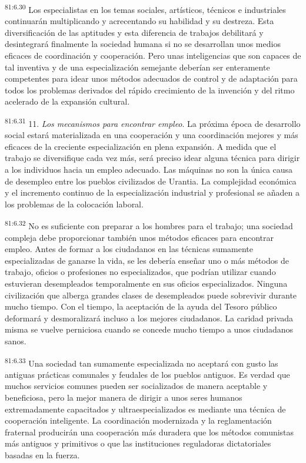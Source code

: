 \par
\textsuperscript{81:6.30} Los especialistas en los temas sociales, artísticos, técnicos e industriales continuarán multiplicando y acrecentando su habilidad y su destreza. Esta diversificación de las aptitudes y esta diferencia de trabajos debilitará y desintegrará finalmente la sociedad humana si no se desarrollan unos medios eficaces de coordinación y cooperación. Pero unas inteligencias que son capaces de tal inventiva y de una especialización semejante deberían ser enteramente competentes para idear unos métodos adecuados de control y de adaptación para todos los problemas derivados del rápido crecimiento de la invención y del ritmo acelerado de la expansión cultural.

\par
\textsuperscript{81:6.31} 11. \textit{Los mecanismos para encontrar empleo}. La próxima época de desarrollo social estará materializada en una cooperación y una coordinación mejores y más eficaces de la creciente especialización en plena expansión. A medida que el trabajo se diversifique cada vez más, será preciso idear alguna técnica para dirigir a los individuos hacia un empleo adecuado. Las máquinas no son la única causa de desempleo entre los pueblos civilizados de Urantia. La complejidad económica y el incremento continuo de la especialización industrial y profesional se añaden a los problemas de la colocación laboral.

\par
\textsuperscript{81:6.32} No es suficiente con preparar a los hombres para el trabajo; una sociedad compleja debe proporcionar también unos métodos eficaces para encontrar empleo. Antes de formar a los ciudadanos en las técnicas sumamente especializadas de ganarse la vida, se les debería enseñar uno o más métodos de trabajo, oficios o profesiones no especializados, que podrían utilizar cuando estuvieran desempleados temporalmente en sus oficios especializados. Ninguna civilización que alberga grandes clases de desempleados puede sobrevivir durante mucho tiempo. Con el tiempo, la aceptación de la ayuda del Tesoro público deformará y desmoralizará incluso a los mejores ciudadanos. La caridad privada misma se vuelve perniciosa cuando se concede mucho tiempo a unos ciudadanos sanos.

\par
\textsuperscript{81:6.33} Una sociedad tan sumamente especializada no aceptará con gusto las antiguas prácticas comunales y feudales de los pueblos antiguos. Es verdad que muchos servicios comunes pueden ser socializados de manera aceptable y beneficiosa, pero la mejor manera de dirigir a unos seres humanos extremadamente capacitados y ultraespecializados es mediante una técnica de cooperación inteligente. La coordinación modernizada y la reglamentación fraternal producirán una cooperación más duradera que los métodos comunistas más antiguos y primitivos o que las instituciones reguladoras dictatoriales basadas en la fuerza.

